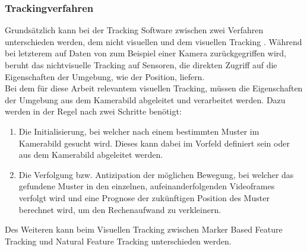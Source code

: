 \subsubsection{Trackingverfahren}\label{sec:Trackingverfahren}
Grundsätzlich kann bei der Tracking Software zwischen zwei Verfahren unterschieden werden, dem nicht visuellen und dem visuellen Tracking \citep[S. 26]{mehler-bicher:augmented-reality}. Während bei letzterem auf Daten von zum Beispiel einer Kamera zurückgegriffen wird, beruht das nichtvisuelle Tracking auf Sensoren, die direkten Zugriff auf die Eigenschaften der Umgebung, wie der Position, liefern. \\
Bei dem für diese Arbeit relevantem visuellen Tracking, müssen die Eigenschaften der Umgebung aus dem Kamerabild abgeleitet und verarbeitet werden. Dazu werden in der Regel nach \citet[S. 26]{mehler-bicher:augmented-reality} zwei Schritte benötigt:
\begin{enumerate}
\item Die Initialisierung, bei welcher nach einem bestimmten Muster im Kamerabild gesucht wird. Dieses kann dabei im Vorfeld definiert sein oder aus dem Kamerabild abgeleitet werden.
\item Die Verfolgung bzw. Antizipation der möglichen Bewegung, bei welcher das gefundene Muster in den einzelnen, aufeinanderfolgenden Videoframes verfolgt wird und eine Prognose der zukünftigen Position des Muster berechnet wird, um den Rechenaufwand zu verkleinern.
\end{enumerate}
Des Weiteren kann beim Visuellen Tracking zwischen Marker Based Feature Tracking und Natural Feature Tracking unterschieden werden. 


